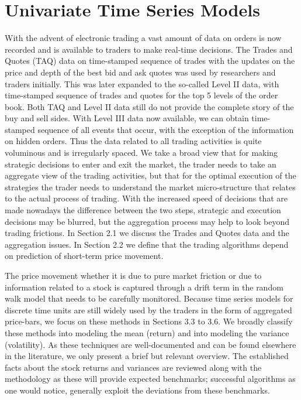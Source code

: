 \chapter{Univariate Time Series Models \label{ch:ch_uvts}}

With the advent of electronic trading a vast amount of data on orders is now recorded and is available to traders to make real-time decisions. The Trades and Quotes (TAQ) data on time-stamped sequence of trades with the updates on the price and depth of the best bid and ask quotes was used by researchers and traders initially. This was later expanded to the so-called Level II data, with time-stamped sequence of trades and quotes for the top 5 levels of the order book. Both TAQ and Level II data still do not provide the complete story of the buy and sell sides. With Level III data now available, we can obtain time-stamped sequence of all events that occur, with the exception of the information on hidden orders. Thus the data related to all trading activities is quite voluminous and is irregularly spaced. We take a broad view that for making strategic decisions to enter and exit the market, the trader needs to take an aggregate view of the trading activities, but that for the optimal execution of the strategies the trader needs to understand the market micro-structure that relates to the actual process of trading. With the increased speed of decisions that are made nowadays the difference between the two steps, strategic and execution decisions may be blurred, but the aggregation process may help to look beyond trading frictions. In Section 2.1 we discuss the Trades and Quotes data and the aggregation issues. In Section 2.2 we define that the trading algorithms depend on prediction of short-term price movement.


The price movement whether it is due to pure market friction or due to information related to a stock is captured through a drift term in the random walk model that needs to be carefully monitored. Because time series models for discrete time units are still widely used by the traders in the form of aggregated price-bars, we focus on these methods in Sections 3.3 to 3.6. We broadly classify these methods into modeling the mean (return) and into modeling the variance (volatility). As these techniques are well-documented and can be found elsewhere in the literature, we only present a brief but relevant overview. The established facts about the stock returns and variances are reviewed along with the methodology as these will provide expected benchmarks; successful algorithms as one would notice, generally exploit the deviations from these benchmarks.


